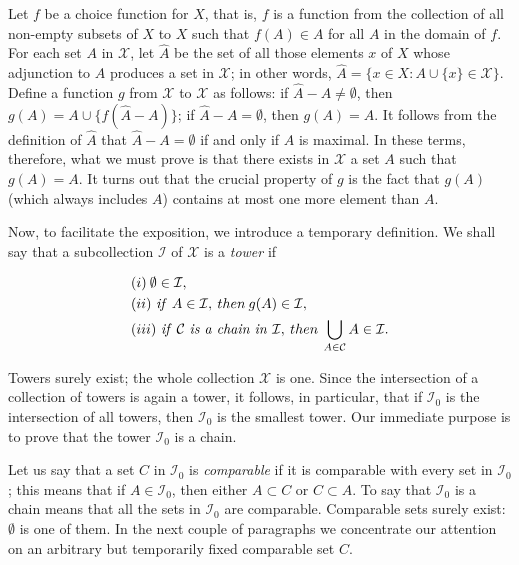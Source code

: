 Let $f$ be a choice function for $X$, that is, $f$ is a function from the collection of all non-empty subsets of $X$ to $X$ such that $f(A) \in A$ for all $A$ in the domain of $f$. For each set $A$ in $\mathcal{X}$, let $\hat{A}$ be the set of all those elements $x$ of $X$ whose adjunction to $A$ produces a set in $\mathcal{X}$; in other words, $\hat{A} =\{ x \in X:A \cup \{ x \} \in \mathcal{X} \}$. Define a function $g$ from $\mathcal{X}$ to $\mathcal{X}$ as follows: if $\hat{A} - A \neq \emptyset $, then $g(A) = A \cup \{ f( \hat{A} - A) \}$; if $\hat{A} - A = \emptyset$, then $g(A) = A$. It follows from the definition of $\hat{A}$ that $\hat{A} - A = \emptyset$ if and only if $A$ is maximal. In these terms, therefore, what we must prove is that there exists in $\mathcal{X}$ a set $A$ such that $g(A) = A$. It turns out that the crucial property of $g$ is the fact that $g(A)$ (which always includes $A$) contains at most one more element than $A$.

Now, to facilitate the exposition, we introduce a temporary definition. We shall say that a subcollection $\mathcal{I}$ of $\mathcal{X}$ is a \textit{tower} if 

\begin{align*} 
&(i) \: \emptyset \in \mathcal{I} , \\
&(ii) \text{ \textit{if} } A \in \mathcal{I}, \: then \: g(A) \in \mathcal{I} ,\\
&(iii) \text{ \textit{if} } \mathcal{C} \text{ \textit{is a chain in} } \mathcal{I}, \: then \: \bigcup_{A \in \mathcal{C}} A \in \mathcal{I}. 
\end{align*}

Towers surely exist; the whole collection $\mathcal{X}$ is one. Since the intersection of a collection of towers is again a tower, it follows, in particular, that if $\mathcal{I}_{0}$ is the intersection of all towers, then $\mathcal{I}_{0}$ is the smallest tower. Our immediate purpose is to prove that the tower $\mathcal{I}_{0}$ is a chain. 

Let us say that a set $C$ in $\mathcal{I}_{0}$ is \textit{comparable} if it is comparable with every set in $\mathcal{I}_{0}$; this means that if $A \in \mathcal{I}_{0}$, then either $A \subset C$ or $C \subset A$. To say that $\mathcal{I}_{0}$ is a chain means that all the sets in $\mathcal{I}_{0}$ are comparable. Comparable sets surely exist: $\emptyset$ is one of them. In the next couple of paragraphs we concentrate our attention on an arbitrary but temporarily fixed comparable set $C$. 

